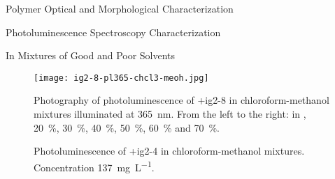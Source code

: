 \begin{section}{Polymer Optical and Morphological Characterization}
\begin{subsection}{Photoluminescence Spectroscopy Characterization}
\begin{subsubsection}{In Mixtures of Good and Poor Solvents}
\begin{figure}[tbp]%
\centering
\texttt{[image: ig2-8-pl365-chcl3-meoh.jpg]}
\caption[Photography of photoluminescence of \cmpd+{ig2-8} in chloro\-form-methanol mixtures.]{Photography of photoluminescence of \cmpd+{ig2-8} in chloro\-form-methanol mixtures illuminated at \SI{365}{\nm}. From the left to the right: in ,  20~\%,  30~\%,  40~\%,  50~\%,  60~\% and  70~\%.}
\label{fig:ig2-8-pl365-chcl3-meoh}
\end{figure}

\begin{figure}[tbp]%
 \caption[Photoluminescence of \cmpd+{ig2-4} in chloro\-form-methanol mixtures.]{Photoluminescence of \cmpd+{ig2-4} in chloro\-form-methanol mixtures. Concentration \SI{137}{\mg\per\liter}.}
\label{fig:ig2-15-pl}
\end{figure}


\end{subsubsection}
\end{subsection}
\end{section}
